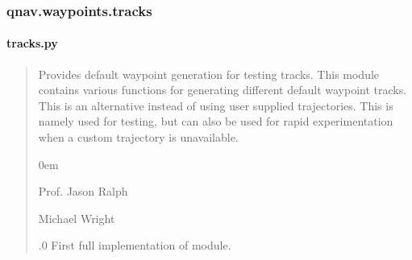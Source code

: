\documentclass[letterpaper,10pt,english]{sphinxmanual}
\begin{document}
\sphinxstepscope


\subsubsection{qnav.waypoints.tracks}
\label{\detokenize{modules/waypoints/tracks:module-qnav.waypoints.tracks}}\label{\detokenize{modules/waypoints/tracks:qnav-waypoints-tracks}}\label{\detokenize{modules/waypoints/tracks::doc}}

\paragraph{tracks.py}
\label{\detokenize{modules/waypoints/tracks:tracks-py}}\begin{quote}\begin{description}
\sphinxAtStartPar
Provides default waypoint generation for testing tracks.
This module contains various functions for generating different default
waypoint tracks. This is an alternative instead of using user supplied
trajectories. This is namely used for testing, but can also be used for
rapid experimentation when a custom trajectory is unavailable.

\begin{DUlineblock}{0em}
\item[] Prof. Jason Ralph \sphinxhyphen{} 
\item[] Michael Wright \sphinxhyphen{} 
\end{DUlineblock}

.0 \sphinxhyphen{} First full implementation of module.

\end{description}\end{quote}
\end{document}
